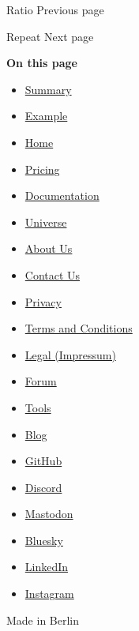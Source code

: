 \href{/docs/reference/layout/ratio/}{\pandocbounded{}}

{ Ratio } { Previous page }

\href{/docs/reference/layout/repeat/}{\pandocbounded{}}

{ Repeat } { Next page }

\textbf{On this page}

\begin{itemize}
\tightlist
\item
  \hyperref[summary]{Summary}
\item
  \hyperref[example]{Example}
\end{itemize}

\begin{itemize}
\tightlist
\item
  \href{/}{Home}
\item
  \href{/pricing/}{Pricing}
\item
  \href{/docs/}{Documentation}
\item
  \href{/universe/}{Universe}
\item
  \href{/about/}{About Us}
\item
  \href{/contact/}{Contact Us}
\item
  \href{/privacy/}{Privacy}
\item
  \href{https://typst.app/terms}{Terms and Conditions}
\item
  \href{/legal/}{Legal (Impressum)}
\end{itemize}

\begin{itemize}
\tightlist
\item
  \href{https://forum.typst.app}{Forum}
\item
  \href{/tools/}{Tools}
\item
  \href{/blog/}{Blog}
\item
  \href{https://github.com/typst/}{GitHub}
\item
  \href{https://discord.gg/2uDybryKPe}{Discord}
\item
  \href{https://mastodon.social/@typst}{Mastodon}
\item
  \href{https://bsky.app/profile/typst.app}{Bluesky}
\item
  \href{https://www.linkedin.com/company/typst/}{LinkedIn}
\item
  \href{https://instagram.com/typstapp/}{Instagram}
\end{itemize}

Made in Berlin
